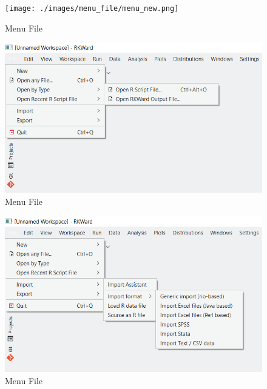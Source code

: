 \documentclass[
  letterpaper,
  DIV=11,
  numbers=noendperiod]{scrreprt}
\begin{document}
\begin{figure}

{\centering \texttt{[image: ./images/menu\_file/menu\_new.png]}

}

\caption{Menu File}

\end{figure}

\begin{figure}

{\centering \includegraphics{./images/menu_file/menu_file_open_type.png}

}

\caption{Menu File}

\end{figure}

\begin{figure}

{\centering \includegraphics{./images/menu_file/menu_file_import_format.png}

}

\caption{Menu File}

\end{figure}
\end{document}
